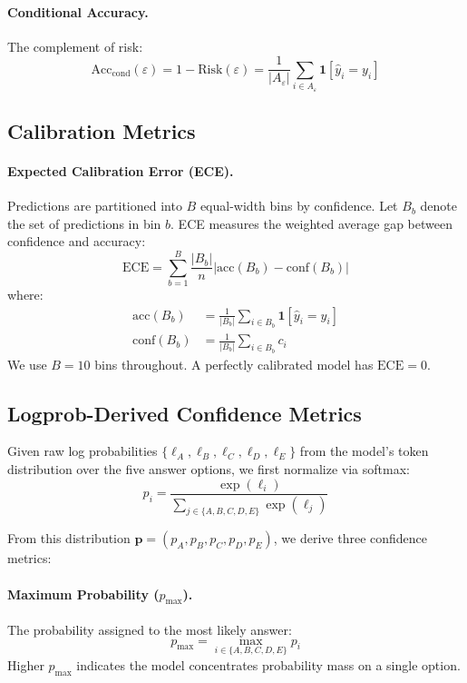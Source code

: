 \documentclass{article}
\begin{document}
\paragraph{Conditional Accuracy.} The complement of risk:
\begin{equation}
\text{Acc}_{\text{cond}}(\varepsilon) = 1 - \text{Risk}(\varepsilon) = \frac{1}{|A_\varepsilon|} \sum_{i \in A_\varepsilon} \mathbf{1}[\hat{y}_i = y_i]
\end{equation}

\subsection{Calibration Metrics}

\paragraph{Expected Calibration Error (ECE).} Predictions are partitioned into $B$ equal-width bins by confidence. Let $B_b$ denote the set of predictions in bin $b$. ECE measures the weighted average gap between confidence and accuracy:
\begin{equation}
\text{ECE} = \sum_{b=1}^{B} \frac{|B_b|}{n} \left| \text{acc}(B_b) - \text{conf}(B_b) \right|
\end{equation}
where:
\begin{align}
\text{acc}(B_b) &= \frac{1}{|B_b|} \sum_{i \in B_b} \mathbf{1}[\hat{y}_i = y_i] \\
\text{conf}(B_b) &= \frac{1}{|B_b|} \sum_{i \in B_b} c_i
\end{align}
We use $B = 10$ bins throughout. A perfectly calibrated model has $\text{ECE} = 0$.

\subsection{Logprob-Derived Confidence Metrics}

Given raw log probabilities $\{\ell_A, \ell_B, \ell_C, \ell_D, \ell_E\}$ from the model's token distribution over the five answer options, we first normalize via softmax:
\begin{equation}
p_i = \frac{\exp(\ell_i)}{\sum_{j \in \{A,B,C,D,E\}} \exp(\ell_j)}
\end{equation}

From this distribution $\mathbf{p} = (p_A, p_B, p_C, p_D, p_E)$, we derive three confidence metrics:

\paragraph{Maximum Probability ($p_{\max}$).} The probability assigned to the most likely answer:
\begin{equation}
p_{\max} = \max_{i \in \{A,B,C,D,E\}} p_i
\end{equation}
Higher $p_{\max}$ indicates the model concentrates probability mass on a single option.
\end{document}

